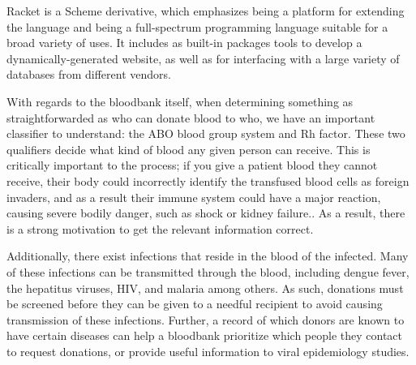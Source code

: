 \documentclass[runningheads,a4paper]{llncs}
\begin{document}
Racket is a Scheme derivative, which emphasizes being a platform for
extending the language and being a full-spectrum programming language
suitable for a broad variety of uses.\cite{racket-org} It includes as
built-in packages tools to develop a dynamically-generated website, as
well as for interfacing with a large variety of databases from
different vendors.

With regards to the bloodbank itself, when determining something as
straightforwarded as who can donate blood to who, we have an important
classifier to understand: the ABO blood group system and Rh
factor. These two qualifiers decide what kind of blood any given
person can receive.\cite{redcross-types} This is critically important
to the process; if you give a patient blood they cannot receive, their
body could incorrectly identify the transfused blood cells as foreign
invaders, and as a result their immune system could have a major
reaction, causing severe bodily danger, such as shock or kidney
failure.\cite{nih-blood}. As a result, there is a strong motivation to
get the relevant information correct.

Additionally, there exist infections that reside in the blood of the
infected. Many of these infections can be transmitted through the
blood, including dengue fever, the hepatitus viruses, HIV, and malaria
among others.\cite{cdc-diseases} As such, donations must be screened
before they can be given to a needful recipient to avoid causing
transmission of these infections. Further, a record of which donors
are known to have certain diseases can help a bloodbank prioritize
which people they contact to request donations, or provide useful
information to viral epidemiology studies.

\end{document}
